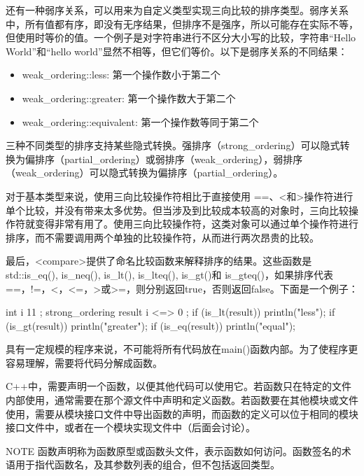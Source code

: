 还有一种弱序关系，可以用来为自定义类型实现三向比较的排序类型。弱序关系中，所有值都有序，即没有无序结果，但排序不是强序，所以可能存在实际不等，但使用时等价的值。一个例子是对字符串进行不区分大小写的比较，字符串“Hello World”和“hello world”显然不相等，但它们等价。以下是弱序关系的不同结果：

\begin{itemize}
\item
weak\_ordering::less: 第一个操作数小于第二个

\item
weak\_ordering::greater: 第一个操作数大于第二个

\item
weak\_ordering::equivalent: 第一个操作数等同于第二个
\end{itemize}

三种不同类型的排序支持某些隐式转换。强排序（strong\_ordering）可以隐式转换为偏排序（partial\_ordering）或弱排序（weak\_ordering），弱排序（weak\_ordering）可以隐式转换为偏排序（partial\_ordering）。

对于基本类型来说，使用三向比较操作符相比于直接使用 ==、<和>操作符进行单个比较，并没有带来太多优势。但当涉及到比较成本较高的对象时，三向比较操作符就变得非常有用了。使用三向比较操作符，这类对象可以通过单个操作符进行排序，而不需要调用两个单独的比较操作符，从而进行两次昂贵的比较。

最后，<compare>提供了命名比较函数来解释排序的结果。这些函数是std::is\_eq(), is\_neq(), is\_lt(), is\_lteq(), is\_gt()和 is\_gteq()，如果排序代表==，!=，<，<=，>或>=，则分别返回true，否则返回false。下面是一个例子：

\begin{cpp}
int i { 11 };
strong_ordering result { i <=> 0 };
if (is_lt(result)) { println("less"); }
if (is_gt(result)) { println("greater"); }
if (is_eq(result)) { println("equal"); }
\end{cpp}


具有一定规模的程序来说，不可能将所有代码放在main()函数内部。为了使程序更容易理解，需要将代码分解成函数。

C++中，需要声明一个函数，以便其他代码可以使用它。若函数只在特定的文件内部使用，通常需要在那个源文件中声明和定义函数。若函数要在其他模块或文件使用，需要从模块接口文件中导出函数的声明，而函数的定义可以位于相同的模块接口文件中，或者在一个模块实现文件中（后面会讨论）。

\begin{myNotic}{NOTE}
函数声明称为函数原型或函数头文件，表示函数如何访问。函数签名的术语用于指代函数名，及其参数列表的组合，但不包括返回类型。
\end{myNotic}

